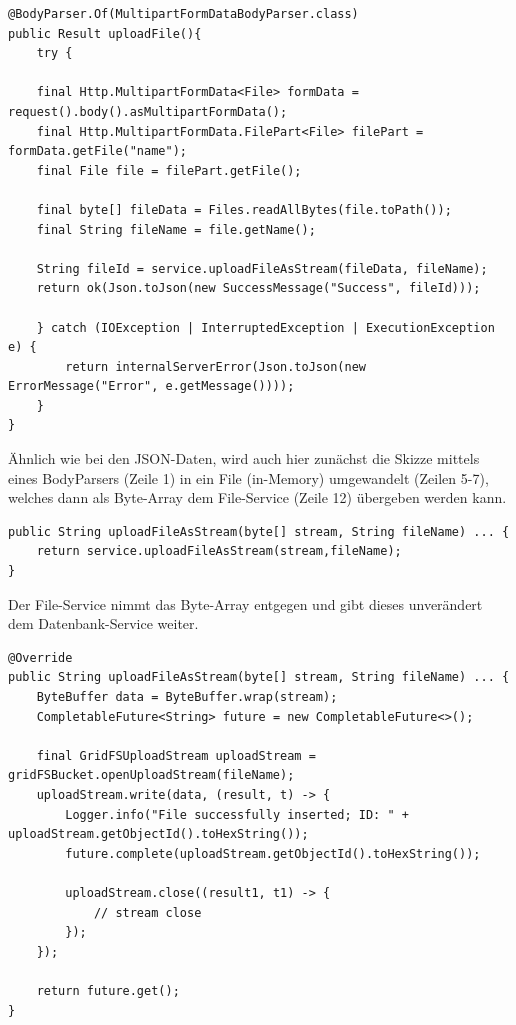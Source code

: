 \begin{lstlisting}[caption={Upload File im File Controller}, label=uploadFileController]
@BodyParser.Of(MultipartFormDataBodyParser.class)
public Result uploadFile(){
    try {

    final Http.MultipartFormData<File> formData = request().body().asMultipartFormData();
    final Http.MultipartFormData.FilePart<File> filePart = formData.getFile("name");
    final File file = filePart.getFile();

    final byte[] fileData = Files.readAllBytes(file.toPath());
    final String fileName = file.getName();

    String fileId = service.uploadFileAsStream(fileData, fileName);
    return ok(Json.toJson(new SuccessMessage("Success", fileId)));

    } catch (IOException | InterruptedException | ExecutionException  e) {
        return internalServerError(Json.toJson(new ErrorMessage("Error", e.getMessage())));
    }
}
\end{lstlisting}

Ähnlich wie bei den JSON-Daten, wird auch hier zunächst die Skizze mittels eines BodyParsers (Zeile 1) in ein File (in-Memory) umgewandelt (Zeilen 5-7), welches dann als Byte-Array dem File-Service (Zeile 12) übergeben werden kann. 

\begin{lstlisting}[caption={Upload File im File Service}, label=uploadFileService]
public String uploadFileAsStream(byte[] stream, String fileName) ... {
    return service.uploadFileAsStream(stream,fileName);
}
\end{lstlisting}

Der File-Service nimmt das Byte-Array entgegen und gibt dieses unverändert dem Datenbank-Service weiter.

\begin{lstlisting}[caption={Upload File im DB Service}, label=uploadFileDBService]
@Override
public String uploadFileAsStream(byte[] stream, String fileName) ... {
    ByteBuffer data = ByteBuffer.wrap(stream);
    CompletableFuture<String> future = new CompletableFuture<>();

    final GridFSUploadStream uploadStream = gridFSBucket.openUploadStream(fileName);
    uploadStream.write(data, (result, t) -> {
        Logger.info("File successfully inserted; ID: " + uploadStream.getObjectId().toHexString());
        future.complete(uploadStream.getObjectId().toHexString());

        uploadStream.close((result1, t1) -> {
            // stream close
        });
    });

    return future.get();
}
\end{lstlisting}

